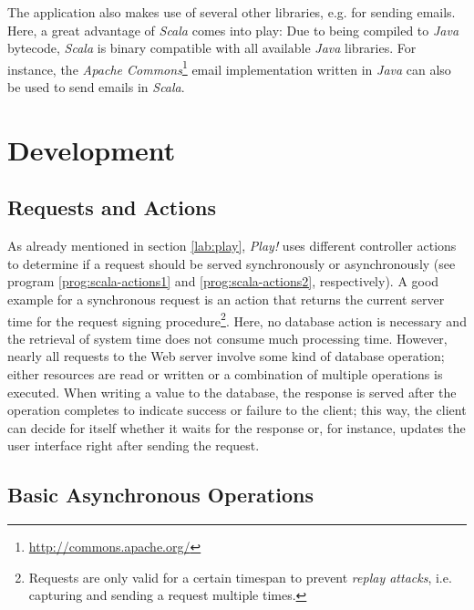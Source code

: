 The application also makes use of several other libraries, e.g. for sending emails. Here, a great advantage of \textit{Scala} comes 
into play: Due to being compiled to \textit{Java} bytecode, \textit{Scala} is binary compatible with all available \textit{Java} libraries. For instance, the \textit{Apache Commons}\footnote{\url{http://commons.apache.org/}} email implementation written in \textit{Java} can also be used to send emails in \textit{Scala}.

\section{Development}
\label{lab:impl-dev}
\subsection{Requests and Actions}
As already mentioned in section \ref{lab:play}, \textit{Play!} uses different controller actions to determine if a request should be served synchronously or asynchronously (see program \ref{prog:scala-actions1} and \ref{prog:scala-actions2}, respectively). A good example for a synchronous request is an action that returns the current server time for the request signing procedure\footnote{Requests are only valid for a certain timespan to prevent \textit{replay attacks}, i.e. capturing and sending a request multiple times.}. Here, no database action is necessary and the retrieval of system time does not consume much processing time. However, nearly all requests to the Web server involve some kind of database operation; either resources are read or written or a combination of multiple operations is executed. When writing a value to the database, the response is served after the operation completes to indicate success or failure to the client; this way, the client can decide for itself whether it waits for the response or, for instance, updates the user interface right after sending the request.

\subsection{Basic Asynchronous Operations}
